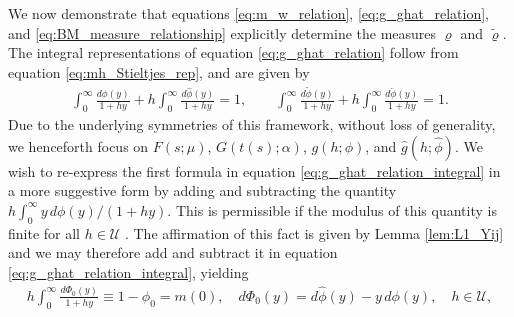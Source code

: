 \documentclass[english,12pt,jmp,graphicx]{revtex4-1}
\newcommand{\ph}{\hat{\phi}}
\newcommand{\pt}{\tilde{\phi}}
\newcommand{\pc}{\check{\phi}}
\begin{document}
We now demonstrate that equations \eqref{eq:m_w_relation},
\eqref{eq:g_ghat_relation}, and \eqref{eq:BM_measure_relationship}
explicitly determine the measures $\varrho$ and $\tilde{\varrho}$. The integral
representations of equation \eqref{eq:g_ghat_relation} follow from
equation \eqref{eq:mh_Stieltjes_rep}, and are given by  
%
\begin{align}\label{eq:g_ghat_relation_integral}
  \int_0^\infty\frac{d\phi(y)}{1+hy}+h\int_0^\infty\frac{d\ph(y)}{1+hy}=1,\qquad
  \int_0^\infty\frac{d\pt(y)}{1+hy}+h\int_0^\infty\frac{d\pc(y)}{1+hy}=1.
\end{align}
%
Due to the underlying symmetries of this framework, without loss of
generality, we henceforth focus on $F(s;\mu)$, $G(t(s);\alpha)$, $g(h;\phi)$,
and $\hat{g}(h;\ph)$. We wish to re-express the first formula in
equation \eqref{eq:g_ghat_relation_integral} in a more suggestive form
by adding and subtracting the quantity $h\int_0^\infty y\,d\phi(y)/(1+hy)$. This
is permissible if the modulus of this quantity is finite for all
$h\in\mathcal{U}$ \cite{Rudin:87,Folland:95}. The affirmation of this
fact is given by Lemma \ref{lem:L1_Yij} and we may therefore add and
subtract it in equation \eqref{eq:g_ghat_relation_integral}, yielding    
%
%
\begin{align}\label{eq:n=0_measure_equivalence}
 h \int_0^\infty\frac{d\Phi_0(y)}{1+hy}\equiv1-\phi_0=m(0),  \quad
 d\Phi_0(y)=d\ph(y)-y\,d\phi(y), \quad
 h\in\mathcal{U},
\end{align}
\end{document}

